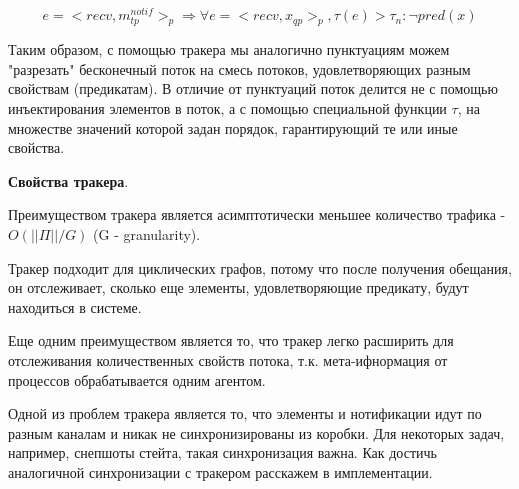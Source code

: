 \documentclass[12pt]{article}
\begin{document}
$$e = <recv,m^{notif}_{tp}>_p \Rightarrow \forall e = <recv,x_{qp}>_p, \tau(e) > \tau_n : \neg pred(x)$$

Таким образом, с помощью тракера мы аналогично пунктуациям можем "разрезать" бесконечный поток на смесь потоков, удовлетворяющих разным свойствам (предикатам). В отличие от пунктуаций поток делится не с помощью инъектирования элементов в поток, а с помощью специальной функции $\tau$, на множестве значений которой задан порядок, гарантирующий те или иные свойства.

\textbf{Свойства тракера}.

Преимуществом тракера является асимптотически меньшее количество трафика - $O(||\Pi|| / G)$ (G - granularity).

Тракер подходит для циклических графов, потому что после получения обещания, он отслеживает, сколько еще элементы, удовлетворяющие предикату, будут находиться в системе.

Еще одним преимуществом является то, что тракер легко расширить для отслеживания количественных свойств потока, т.к. мета-ифнормация от процессов обрабатывается одним агентом.

Одной из проблем тракера является то, что элементы и нотификации идут по разным каналам и никак не синхронизированы из коробки. Для некоторых задач, например, снепшоты стейта, такая синхронизация важна. Как достичь аналогичной синхронизации с тракером расскажем в имплементации.

% 
\end{document}
